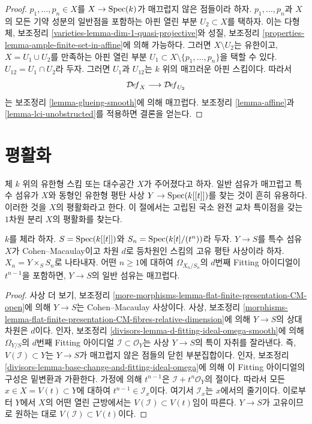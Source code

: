 \begin{proof}
$p_1, \ldots, p_n \in X$를 $X \to \mathop{\mathrm{Spec}}(k)$가 매끄럽지 않은 점들이라
하자. $p_1, \ldots, p_n$과 $X$의 모든 기약 성분의 일반점을 포함하는
아핀 열린 부분 $U_2 \subset X$를 택하자. 이는 다형체, 보조정리
\ref{varieties-lemma-dim-1-quasi-projective}와 성질, 보조정리
\ref{properties-lemma-ample-finite-set-in-affine}에 의해 가능하다. 그러면
$X \setminus U_2$는 유한이고, $X = U_1 \cup U_2$를 만족하는 아핀 열린
부분 $U_1 \subset X \setminus \{p_1, \ldots, p_n\}$을 택할 수 있다.
$U_{12} = U_1 \cap U_2$라 두자. 그러면 $U_1$과 $U_{12}$는 $k$ 위의
매끄러운 아핀 스킴이다. 따라서
$$
\mathcal{D}\!\mathit{ef}_X \longrightarrow \mathcal{D}\!\mathit{ef}_{U_2}
$$
는 보조정리 \ref{lemma-glueing-smooth}에 의해 매끄럽다. 보조정리
\ref{lemma-affine}과 \ref{lemma-lci-unobstructed}를 적용하면 결론을 얻는다.
\end{proof}




\section{평활화}
\label{section-smoothing}

\noindent
체 $k$ 위의 유한형 스킴 또는 대수공간 $X$가 주어졌다고 하자. 일반
섬유가 매끄럽고 특수 섬유가 $X$와 동형인 유한형 평탄 사상
$Y \to \mathop{\mathrm{Spec}}(k[[t]])$를 찾는 것이 흔히 유용하다. 이러한 것을 $X$의
평활화라고 한다. 이 절에서는 고립된 국소 완전 교차 특이점을 갖는
$1$차원 분리 $X$의 평활화를 찾는다.

\begin{lemma}
\label{lemma-criterion-smoothing}
$k$를 체라 하자. $S = \mathop{\mathrm{Spec}}(k[[t]])$와
$S_n = \mathop{\mathrm{Spec}}(k[t]/(t^n))$라 두자. $Y \to S$를 특수 섬유 $X$가
Cohen--Macaulay이고 차원 $d$로 등차원인 스킴의 고유 평탄 사상이라 하자.
$X_n = Y \times_S S_n$로 나타내자. 어떤 $n \geq 1$에 대하여
$\Omega_{X_n/S_n}$의 $d$번째 Fitting 아이디얼이 $t^{n - 1}$을 포함하면,
$Y \to S$의 일반 섬유는 매끄럽다.
\end{lemma}

\begin{proof}
사상 더 보기, 보조정리
\ref{more-morphisms-lemma-flat-finite-presentation-CM-open}에 의해
$Y \to S$는 Cohen--Macaulay 사상이다. 사상, 보조정리
\ref{morphisms-lemma-flat-finite-presentation-CM-fibres-relative-dimension}에
의해 $Y \to S$의 상대 차원은 $d$이다. 인자, 보조정리
\ref{divisors-lemma-d-fitting-ideal-omega-smooth}에 의해
$\Omega_{Y/S}$의 $d$번째 Fitting 아이디얼
$\mathcal{I} \subset \mathcal{O}_Y$는 사상 $Y \to S$의 특이 자취를
잘라낸다. 즉, $V(\mathcal{I}) \subset Y$는 $Y \to S$가 매끄럽지 않은
점들의 닫힌 부분집합이다. 인자, 보조정리
\ref{divisors-lemma-base-change-and-fitting-ideal-omega}에 의해 이 Fitting
아이디얼의 구성은 밑변환과 가환한다. 가정에 의해 $t^{n - 1}$은
$\mathcal{I} + t^n\mathcal{O}_Y$의 절이다. 따라서 모든
$x \in X = V(t) \subset Y$에 대하여 $t^{n - 1} \in \mathcal{I}_x$이다.
여기서 $\mathcal{I}_x$는 $x$에서의 줄기이다. 이로부터 $Y$에서 $X$의
어떤 열린 근방에서는 $V(\mathcal{I}) \subset V(t)$임이 따른다.
$Y \to S$가 고유이므로 원하는 대로 $V(\mathcal{I}) \subset V(t)$이다.
\end{proof}

